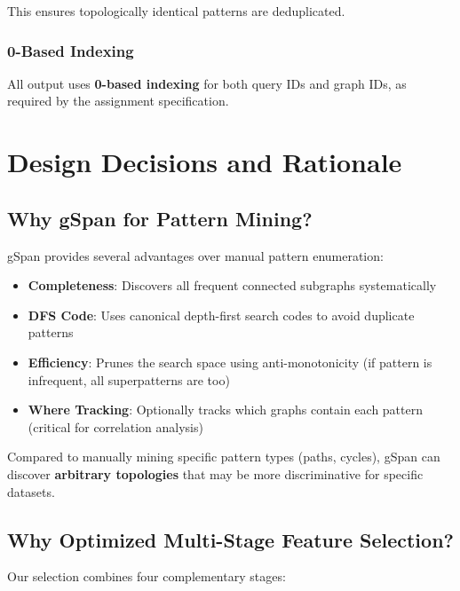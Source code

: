 \documentclass[12pt,a4paper]{article}
\begin{document}
This ensures topologically identical patterns are deduplicated.

\subsubsection{0-Based Indexing}

All output uses \textbf{0-based indexing} for both query IDs and graph IDs, as required by the assignment specification.

\section{Design Decisions and Rationale}

\subsection{Why gSpan for Pattern Mining?}

gSpan provides several advantages over manual pattern enumeration:

\begin{itemize}
    \item \textbf{Completeness}: Discovers all frequent connected subgraphs systematically
    \item \textbf{DFS Code}: Uses canonical depth-first search codes to avoid duplicate patterns
    \item \textbf{Efficiency}: Prunes the search space using anti-monotonicity (if pattern is infrequent, all superpatterns are too)
    \item \textbf{Where Tracking}: Optionally tracks which graphs contain each pattern (critical for correlation analysis)
\end{itemize}

Compared to manually mining specific pattern types (paths, cycles), gSpan can discover \textbf{arbitrary topologies} that may be more discriminative for specific datasets.

\subsection{Why Optimized Multi-Stage Feature Selection?}

Our selection combines four complementary stages:
\end{document}
